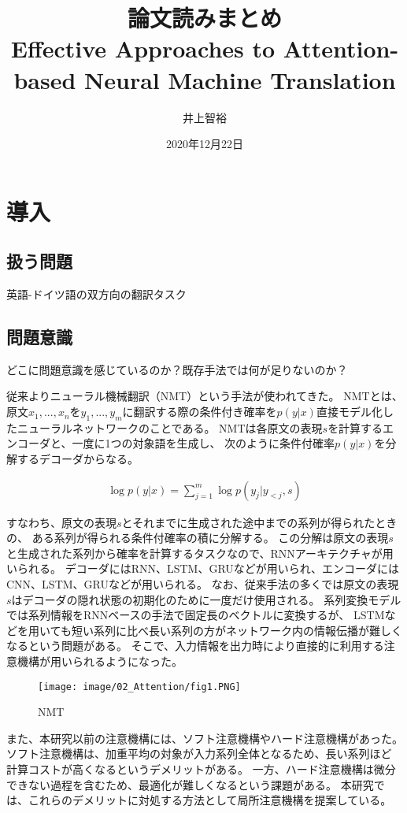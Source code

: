 \documentclass{jsarticle}
\title{\vspace{-3cm}論文読みまとめ\\Effective Approaches to Attention-based Neural Machine Translation
}
\author{井上智裕}
\date{2020年12月22日}
\begin{document}
\maketitle
\vspace{-1cm}
\section{導入}
\subsection{扱う問題}
英語-ドイツ語の双方向の翻訳タスク

\subsection{問題意識}
どこに問題意識を感じているのか？既存手法では何が足りないのか？

従来よりニューラル機械翻訳（NMT）という手法が使われてきた。 
NMTとは、原文$x_1, . . . , x_n$を$ y_1, . . . , y_m$に翻訳する際の条件付き確率を$p(y|x)$直接モデル化したニューラルネットワークのことである。
NMTは各原文の表現$s$を計算するエンコーダと、一度に1つの対象語を生成し、
次のように条件付確率$p(y|x)$を分解するデコーダからなる。

\begin{eqnarray}
  \log p(y|x) = \sum_{j=1}^m \log p(y_j|y_{<j},s)
\end{eqnarray}

すなわち、原文の表現$s$とそれまでに生成された途中までの系列が得られたときの、
ある系列が得られる条件付確率の積に分解する。
この分解は原文の表現$s$と生成された系列から確率を計算するタスクなので、RNNアーキテクチャが用いられる。
デコーダにはRNN、LSTM、GRUなどが用いられ、エンコーダにはCNN、LSTM、GRUなどが用いられる。
なお、従来手法の多くでは原文の表現$s$はデコーダの隠れ状態の初期化のために一度だけ使用される。
系列変換モデルでは系列情報をRNNベースの手法で固定長のベクトルに変換するが、
LSTMなどを用いても短い系列に比べ長い系列の方がネットワーク内の情報伝播が難しくなるという問題がある。
そこで、入力情報を出力時により直接的に利用する注意機構が用いられるようになった。

\begin{figure}[H]
  \begin{center}
    \texttt{[image: image/02\_Attention/fig1.PNG]}
    \caption{NMT}
    \label{fig:fig1}
  \end{center}
\end{figure}

また、本研究以前の注意機構には、ソフト注意機構やハード注意機構があった。
ソフト注意機構は、加重平均の対象が入力系列全体となるため、長い系列ほど
計算コストが高くなるというデメリットがある。
一方、ハード注意機構は微分できない過程を含むため、最適化が難しくなるという課題がある。
本研究では、これらのデメリットに対処する方法として局所注意機構を提案している。
\end{document}
